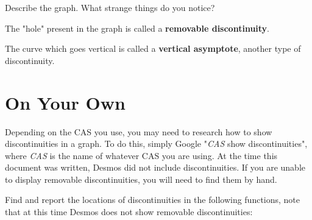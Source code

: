 \documentclass{ximera}
\begin{document}
\begin{question}
Describe the graph. What strange things do you notice?
\begin{freeResponse}
\end{freeResponse}
\end{question}
The "hole" present in the graph is called a \textbf{removable discontinuity}.

The curve which goes vertical is called a \textbf{vertical asymptote}, another type of discontinuity.

\section{On Your Own}
Depending on the CAS you use, you may need to research how to show discontinuities in a graph. To do this, simply Google "\textit{CAS} show discontinuities", where \textit{CAS} is the name of whatever CAS you are using. At the time this document was written, Desmos did not include discontinuities. If you are unable to display removable discontinuities, you will need to find them by hand.

Find and report the locations of discontinuities in the following functions, note that at this time Desmos does not show removable discontinuities:
\end{document}
